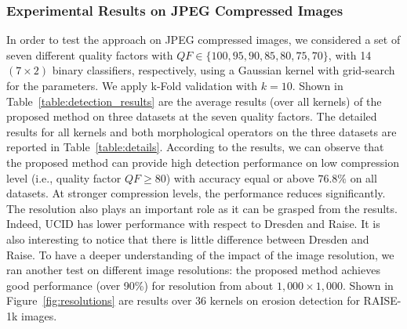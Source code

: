 \documentclass{ieeeaccess}
\begin{document}

\subsubsection{Experimental Results on JPEG Compressed Images}
%
In order to test the approach on JPEG compressed images, we considered a set of seven different quality factors with $QF \in \{100,95,90,85,80,75,70\}$, with 14 $(7\times 2)$ binary classifiers, respectively,
using a Gaussian kernel with grid-search for the parameters. We apply k-Fold validation with $k = 10$. Shown in Table~\ref{table:detection_results} are the average results (over all kernels) of the proposed method on three datasets at the seven quality factors. The detailed results for all kernels and both morphological operators on the three datasets are reported in Table~\ref{table:details}. 
%
According to the results, we can observe that the proposed method can provide high detection performance on low compression level (i.e., quality factor $QF \ge 80$) with accuracy equal or above $76.8\%$ on all datasets. At stronger compression levels, the performance reduces significantly. The resolution also plays an important role as it can be grasped from the results. Indeed, UCID has lower performance with respect to Dresden and Raise. It is also interesting to notice that there is little difference between Dresden and Raise. To have a deeper understanding of the impact of the image resolution, we ran another test on different image resolutions: the proposed method achieves good performance (over 90\%) for resolution from about $1,000 \times 1,000$. Shown in Figure~\ref{fig:resolutions} are results over 36 kernels on erosion detection for RAISE-1k images.%
\end{document}
